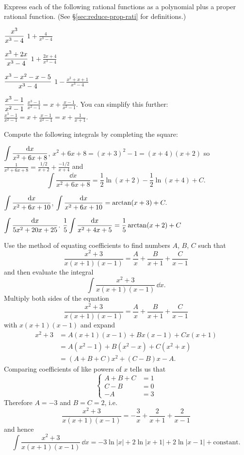 \problemfont %
\begin{multicols}{2}
\problem Express each of the following rational functions as a polynomial %
plus a proper rational function. (See \S\ref{sec:reduce-prop-rati}
for definitions.)

\subprob$\displaystyle \frac{x^3}{x^3 -4} $
\answer %
$1+\frac4{x^3-4}$
\endanswer

\subprob$\displaystyle \frac{x^3+2x}{x^3-4} $
\answer %
$1+\frac{2x+4}{x^3-4}$
\endanswer

\subprob$\displaystyle \frac{x^3 -x^2 -x -5}{x^3-4}$
\answer %
$1-\frac{x^2+x+1}{x^3-4}$
\endanswer

\subprob$\displaystyle \frac{x^3-1}{x^2-1}$
\answer %
$\frac{x^3-1}{x^2-1} = x+\frac{x-1}{x^2-1}$.  You can simplify this
further: $\frac{x^3-1}{x^2-1} = x+\frac{x-1}{x^2-1} = x+\frac{1}{x+1}$.
\endanswer

\problem Compute the following integrals by completing the square: %

\subprob $\displaystyle \int\frac{\mathrm{d}
x}{x^2+6x+8}$,
\answer %
$x^2+6x+8 = (x+3)^2-1 = (x+4)(x+2)$ so $\frac1{x^2+6x+8} =
\frac{1/2}{x+2}+\frac{-1/2}{x+4}$ and
\[
\int\frac{\dd x}{x^2+6x+8}=\frac12\ln(x+2)-\frac12\ln(x+4)+C.
\]
\endanswer

\subprob $\displaystyle \int\frac{\mathrm{d} x}{x^2+6x+10}$,
\answer %
$\displaystyle\int\frac{\mathrm{d} x}{x^2+6x+10} = \arctan(x+3)+C.$
\endanswer

\subprob $\displaystyle \int\frac{\mathrm{d} x}{5x^2+20x+25}$.
\answer %
$\displaystyle\frac15\int\frac{\mathrm{d} x}{x^2+4x+5}= \frac15\arctan(x+2)+C$
\endanswer

\problem Use the method of equating coefficients to find numbers %
$A$, $B$, $C$ such that
\[
\frac{x^2+3}{x(x+1)(x-1)} = \frac{A}{x}+\frac{B}{x+1}+\frac{C}{x-1}
\]
and then evaluate the integral
\[
\int\frac{x^2+3}{x(x+1)(x-1)}\,\dd x.
\]
\answer %
Multiply both sides of the equation
\[
\frac{x^2+3}{x(x+1)(x-1)} = \frac{A}{x}+\frac{B}{x+1}+\frac{C}{x-1}
\]
with $x(x+1)(x-1)$ and expand
\begin{align*}
  x^2+3
  &= A(x+1)(x-1)+Bx(x-1)+Cx(x+1) \\
  &= A(x^2-1)+B(x^2-x)+C(x^2+x) \\
  &=(A+B+C)x^2 +(C-B)x-A.
\end{align*}
Comparing coefficients of like powers of $x$ tells us that 
\[
\left\{
\begin{aligned}
  A+B+C &=1 \\
  C-B &=0\\
  -A &= 3
\end{aligned}
\right.
\]
Therefore  $A=-3$ and $B=C=2$, i.e.
\[
\frac{x^2+3}{x(x+1)(x-1)} = -
\frac{3}{x} + \frac{2}{x+1}+\frac{2}{x-1}
\]
and hence
\[
\int \frac{x^2+3}{x(x+1)(x-1)}\,\dd x = -3\ln |x| + 2\ln |x+1|
+2\ln|x-1| + \mbox{constant}.
\]
\endanswer




\end{multicols}

